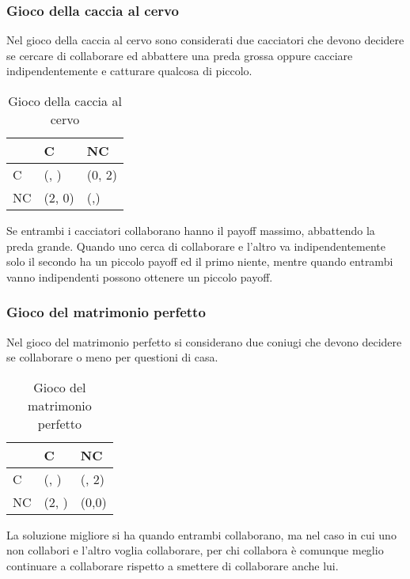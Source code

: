 \documentclass[\main/main.tex]{subfiles}
\begin{document}
\subsubsection*{Gioco della caccia al cervo}
Nel gioco della caccia al cervo sono considerati due cacciatori che devono decidere se cercare di collaborare ed abbattere una preda grossa oppure cacciare indipendentemente e catturare qualcosa di piccolo.

\begin{table}
  \begin{tabular}{|L|L|L|}
    \hline
       & C                      & NC                    \\
    \hline
    C  & (, ) & (0, 2)                \\
    \hline
    NC & (2, 0)                 & (,) \\
    \hline
  \end{tabular}
  \caption{Gioco della caccia al cervo}
\end{table}

Se entrambi i cacciatori collaborano hanno il payoff massimo, abbattendo la preda grande. Quando uno cerca di collaborare e l'altro va indipendentemente solo il secondo ha un piccolo payoff ed il primo niente, mentre quando entrambi vanno indipendenti possono ottenere un piccolo payoff.

\subsubsection*{Gioco del matrimonio perfetto}
Nel gioco del matrimonio perfetto si considerano due coniugi che devono decidere se collaborare o meno per questioni di casa.

\begin{table}
  \begin{tabular}{|L|L|L|}
    \hline
       & C                      & NC             \\
    \hline
    C  & (, ) & (, 2) \\
    \hline
    NC & (2, )         & (0,0)          \\
    \hline
  \end{tabular}
  \caption{Gioco del matrimonio perfetto}
\end{table}

La soluzione migliore si ha quando entrambi collaborano, ma nel caso in cui uno non collabori e l'altro voglia collaborare, per chi collabora è comunque meglio continuare a collaborare rispetto a smettere di collaborare anche lui.
\end{document}
